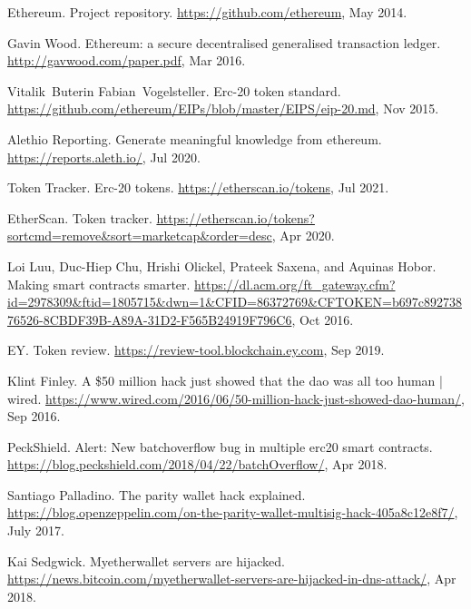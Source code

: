\begin{thebibliography}{10}

Ethereum.
\newblock Project repository.
\newblock \url{https://github.com/ethereum}, May 2014.

Gavin Wood.
\newblock Ethereum: a secure decentralised generalised transaction ledger.
\newblock \url{http://gavwood.com/paper.pdf}, Mar 2016.

Vitalik~Buterin Fabian~Vogelsteller.
\newblock Erc-20 token standard.
\newblock \url{https://github.com/ethereum/EIPs/blob/master/EIPS/eip-20.md},
  Nov 2015.

Alethio Reporting.
\newblock Generate meaningful knowledge from ethereum.
\newblock \url{https://reports.aleth.io/}, Jul 2020.

Token Tracker.
\newblock Erc-20 tokens.
\newblock \url{https://etherscan.io/tokens}, Jul 2021.

EtherScan.
\newblock Token tracker.
\newblock
  \url{https://etherscan.io/tokens?sortcmd=remove&sort=marketcap&order=desc},
  Apr 2020.

Loi Luu, Duc-Hiep Chu, Hrishi Olickel, Prateek Saxena, and Aquinas Hobor.
\newblock Making smart contracts smarter.
\newblock
  \url{https://dl.acm.org/ft_gateway.cfm?id=2978309&ftid=1805715&dwn=1&CFID=86372769&CFTOKEN=b697c89273876526-8CBDF39B-A89A-31D2-F565B24919F796C6},
  Oct 2016.

EY.
\newblock Token review.
\newblock \url{https://review-tool.blockchain.ey.com}, Sep 2019.

Klint Finley.
\newblock A \$50 million hack just showed that the dao was all too human |
  wired.
\newblock
  \url{https://www.wired.com/2016/06/50-million-hack-just-showed-dao-human/},
  Sep 2016.

PeckShield.
\newblock Alert: New batchoverflow bug in multiple erc20 smart contracts.
\newblock \url{https://blog.peckshield.com/2018/04/22/batchOverflow/}, Apr
  2018.

Santiago Palladino.
\newblock The parity wallet hack explained.
\newblock
  \url{https://blog.openzeppelin.com/on-the-parity-wallet-multisig-hack-405a8c12e8f7/},
  July 2017.

Kai Sedgwick.
\newblock Myetherwallet servers are hijacked.
\newblock
  \url{https://news.bitcoin.com/myetherwallet-servers-are-hijacked-in-dns-attack/},
  Apr 2018.


\end{thebibliography}
